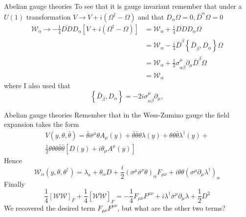 \documentclass[10pt]{beamer}
\begin{document}
\begin{frame}{Abelian gauge theories}
To see that it is gauge invariant remember that under a $U(1)$ transformation $V \to V + i\left(\Omega^{\dagger} - \Omega\right)$ and that 
$D_\alpha \Omega = 0, \bar D^{\dot \alpha} \Omega = 0$
\begin{equation*}
\begin{aligned}
    \mathcal{W}_{\alpha} \rightarrow-\frac{1}{4} \overline{D D} D_{\alpha}\left[V+i\left(\Omega^{\dagger}-\Omega\right)\right] &=\mathcal{W}_{\alpha}+\frac{i}{4} \overline{D D} D_{\alpha} \Omega \\
    &=\mathcal{W}_{\alpha}-\frac{i}{4} \bar{D}^{\dot{\beta}}\left\{\bar{D}_{\dot{\beta}}, D_{\alpha}\right\} \Omega \\
    &=\mathcal{W}_{\alpha}+\frac{1}{2} \sigma_{\alpha \dot{\beta}}^{\mu} \partial_{\mu} \bar{D}^{\dot{\beta}} \Omega \\
    &=\mathcal{W}_{\alpha}
\end{aligned}
\end{equation*}
where I also used that 
\begin{equation*}
    \left\{\bar{D}_{\bar\beta}, D_{\alpha}\right\}= - 2 i \sigma_{\alpha \dot{\beta}}^{\mu} \partial_{\mu},
\end{equation*}
\end{frame}

\begin{frame}{Abelian gauge theories}
Remember that in the Wess-Zumino gauge the field expansion takes the form 
\begin{gather*}
    V(y, \theta, \bar \theta) = \bar\theta \bar{\sigma}^{\mu} \theta A_{\mu}(y)+\bar\theta \bar\theta \theta \lambda(y)+\theta \theta \bar\theta \lambda^{\dagger}(y) + \\ 
    \frac{1}{2} \theta \theta \theta \bar\theta \bar\theta\left[D(y)+i \theta_{\mu} A^{\mu}(y)\right]
\end{gather*}
Hence 
\begin{equation*}
    \mathcal{W}_{\alpha}\left(y, \theta, \theta^{\dagger}\right)=\lambda_{a}+\theta_{\alpha} D+\frac{i}{2}\left(\sigma^{\mu} \bar{\sigma}^{\nu} \theta\right)_{\alpha} F_{\mu \nu}+i \theta \theta\left(\sigma^{\mu} \partial_{\mu} \lambda^{\dagger}\right)_{\alpha}
\end{equation*}
Finally 
\begin{equation*}
    \frac{1}{4}\left[\mathcal{WW}\right]_F + \frac{1}{4} \left[\overline{\mathcal{WW}}\right]_F = -\frac{1}{4} F_{\mu\nu} F^{\mu\nu} + i \lambda^{\dagger} \bar\sigma^{\mu} \partial_{\mu} \lambda + \frac{1}{2} D^2
\end{equation*}
We recovered the desired term $F_{\mu\nu}F^{\mu\nu}$, but what are the other two terms?
\end{frame}
\end{document}
